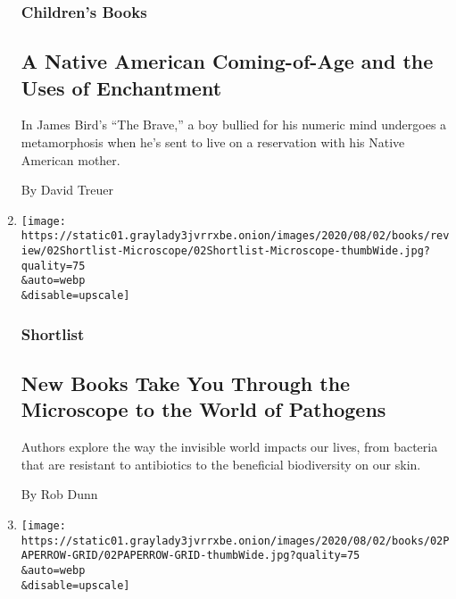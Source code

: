 \begin{enumerate}
  \hypertarget{childrens-books-3}{%
  \subsubsection{Children's Books}\label{childrens-books-3}}

  \hypertarget{a-native-american-coming-of-age-and-the-uses-of-enchantment}{%
  \subsection{A Native American Coming-of-Age and the Uses of
  Enchantment}\label{a-native-american-coming-of-age-and-the-uses-of-enchantment}}

  In James Bird's ``The Brave,'' a boy bullied for his numeric mind
  undergoes a metamorphosis when he's sent to live on a reservation with
  his Native American mother.

  By David Treuer
\item
  \href{/2020/07/31/books/review/biography-of-resistance-muhammad-zaman-clean-james-hamblin-the-sensitives-oliver-broudy.html}{}

  \texttt{[image: https://static01.graylady3jvrrxbe.onion/images/2020/08/02/books/review/02Shortlist-Microscope/02Shortlist-Microscope-thumbWide.jpg?quality=75\\\&auto=webp\\\&disable=upscale]}

  \hypertarget{shortlist}{%
  \subsubsection{Shortlist}\label{shortlist}}

  \hypertarget{new-books-take-you-through-the-microscope-to-the-world-of-pathogens}{%
  \subsection{New Books Take You Through the Microscope to the World of
  Pathogens}\label{new-books-take-you-through-the-microscope-to-the-world-of-pathogens}}

  Authors explore the way the invisible world impacts our lives, from
  bacteria that are resistant to antibiotics to the beneficial
  biodiversity on our skin.

  By Rob Dunn
\item
  \href{/2020/07/31/books/review/new-paperbacks.html}{}

  \texttt{[image: https://static01.graylady3jvrrxbe.onion/images/2020/08/02/books/02PAPERROW-GRID/02PAPERROW-GRID-thumbWide.jpg?quality=75\\\&auto=webp\\\&disable=upscale]}


\end{enumerate}
